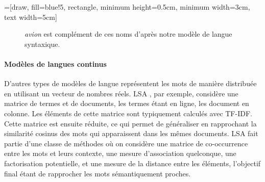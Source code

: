 =[draw, fill=blue!5, rectangle, minimum height=0.5cm, minimum width=3cm, text width=5cm]

\begin{figure}[ht]
  \centering
  \caption{\textit{avion} est complément de ces noms d'après notre modèle de langue syntaxique.}
\end{figure}

\paragraph{Modèles de langues continus} D'autres types de modèles de langue
représentent les mots de manière distribuée en utilisant un vecteur de nombres
réels. LSA \citep{deerwester1990indexing}, par exemple, considère une matrice
de termes et de documents, les termes étant en ligne, les document en colonne.
Les éléments de cette matrice sont typiquement calculés avec TF-IDF. Cette
matrice est ensuite réduite, ce qui permet de généraliser en rapprochant la
similarité cosinus des mots qui apparaissent dans les mêmes documents. LSA fait
partie d'une classe de méthodes où on considère une matrice de co-occurrence
entre les mots et leurs contexte, une mesure d'association quelconque, une
factorisation potentielle, et une mesure de la distance entre les éléments,
l'objectif final étant de rapprocher les mots sémantiquement proches.

